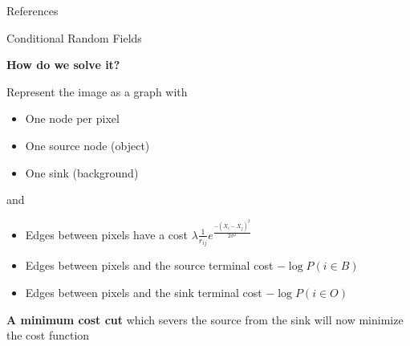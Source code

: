 \documentclass[10pt]{beamer}
\begin{document}
\begin{frame}[allowframebreaks]{References}

  
  

\end{frame}







%
%

\begin{frame}[fragile]{Conditional Random Fields}

  \textbf{How do we solve it?}

  Represent the image as a graph with
  \begin{itemize}
  \item One node per pixel
  \item One source node (object)
  \item One sink (background)
  \end{itemize}

  \pause
  and
  
  \begin{itemize}
  \item Edges between pixels have a cost $\lambda \frac{1}{r_{ij}} e^{\frac{-(X_{i}-X_{j})^2}{2\sigma^2}}$
  \item Edges between pixels and the source terminal cost  $-\log P(i \in B)$
  \item Edges between pixels and the sink terminal cost  $-\log P(i \in O)$
  \end{itemize}
  
  \textbf{A minimum cost cut} which severs the source from the sink will now minimize the cost function
  
\end{frame}
\end{document}
